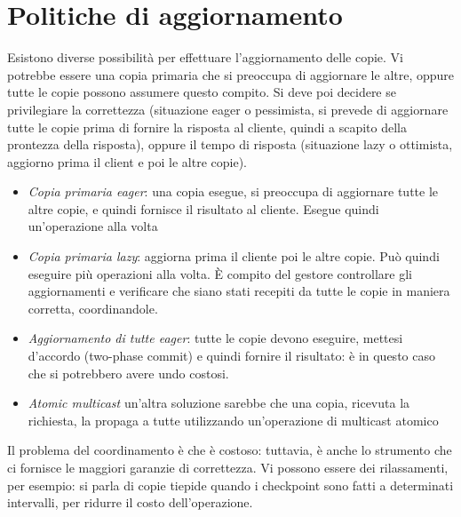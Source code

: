 \section{Politiche di aggiornamento}
Esistono diverse possibilità per effettuare l'aggiornamento delle copie. Vi 
potrebbe essere una copia primaria che si
preoccupa di aggiornare le altre, oppure tutte le copie possono assumere questo 
compito. Si deve poi decidere se
privilegiare la correttezza (situazione eager o pessimista, si prevede di 
aggiornare tutte le copie prima di fornire
la risposta al cliente, quindi a scapito della prontezza della risposta), 
oppure il tempo di risposta (situazione
lazy o ottimista, aggiorno prima il client e poi le altre copie).
\begin{itemize}
 \item \textit{Copia primaria eager}: una copia esegue, si preoccupa di 
aggiornare tutte le altre copie, e quindi
 fornisce il risultato al cliente. Esegue quindi un'operazione alla volta
 \item \textit{Copia primaria lazy}: aggiorna prima il cliente poi le altre 
copie. Può quindi eseguire più operazioni
 alla volta. È compito del gestore controllare gli aggiornamenti e verificare 
che siano stati recepiti da tutte le copie
 in maniera corretta, coordinandole.
 \item \textit{Aggiornamento di tutte eager}: tutte le copie devono eseguire, 
mettesi d'accordo (two-phase commit) e
 quindi fornire il risultato: è in questo caso che si potrebbero avere undo
 costosi.
 \item \textit{Atomic multicast} un'altra soluzione sarebbe che una copia,
 ricevuta la richiesta, la propaga a tutte utilizzando un'operazione di
 multicast atomico
\end{itemize}
Il problema del coordinamento è che è costoso: tuttavia, è anche lo strumento 
che ci fornisce le maggiori garanzie di
correttezza. Vi possono essere dei rilassamenti, per esempio: si parla di copie 
tiepide quando i checkpoint sono fatti
a determinati intervalli, per ridurre il costo dell'operazione.
